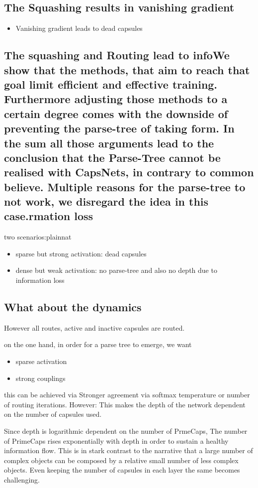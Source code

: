 \documentclass{article}
\begin{document}
\subsection{The Squashing results in vanishing gradient}
\begin{itemize}
	\item Vanishing gradient leads to dead capsules
\end{itemize}
\subsection{The squashing and Routing lead to infoWe show that the methods, that aim to reach that goal limit efficient and effective training.
	Furthermore adjusting those methods to a certain degree comes with the downside of preventing the parse-tree of taking form.
	In the sum all those arguments lead to the conclusion that the Parse-Tree cannot be realised with CapsNets, in contrary to common believe.
	Multiple reasons for the parse-tree to not work, we disregard the idea in this case.rmation loss}
two scenarios:plainnat
\begin{itemize}
	\item sparse but strong activation: dead capsules
	\item dense but weak activation: no parse-tree and also no depth due to information loss
\end{itemize}
\subsection{What about the dynamics}


However all routes, active and inactive capsules are routed.

on the one hand, in order for a parse tree to emerge, we want
\begin{itemize}
	\item sparse activation
	\item strong couplings
\end{itemize}
this can be achieved via Stronger agreement via softmax temperature or number of routing iterations.
However: This makes the depth of the network dependent on the number of capsules used.


Since depth is logarithmic dependent on the number of PrmeCaps, The number of PrimeCaps rises exponentially with depth in order to sustain a healthy information flow. This is in stark contrast to the narrative that a large number of complex objects can be composed by a relative small number of less complex objects.
Even keeping the number of capsules in each layer the same becomes challenging.
\end{document}
